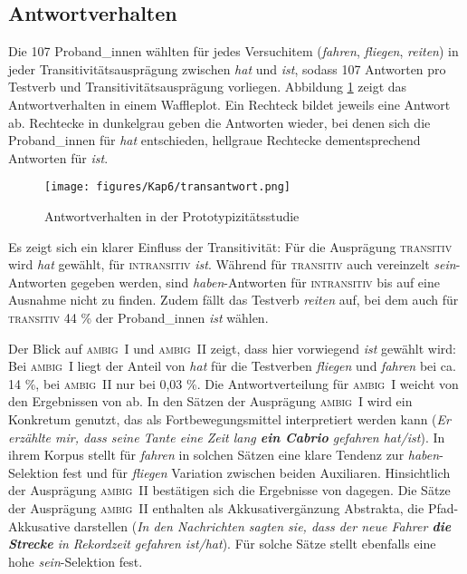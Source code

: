 \subsection{Antwortverhalten}
\label{antproto}
Die 107 Proband\_innen wählten für jedes Versuchitem (\textit{fahren}, \textit{fliegen}, \textit{reiten}) in jeder Transitivitätsausprägung zwischen \textit{hat} und \textit{ist}, sodass 107 Antworten pro Testverb und Transitivitätsausprägung vorliegen. Abbildung \ref{transantwortalle} zeigt das Antwortverhalten in einem Waffleplot. Ein Rechteck bildet jeweils eine Antwort ab. Rechtecke in dunkelgrau geben die Antworten wieder, bei denen sich die Proband\_innen für \textit{hat} entschieden, hellgraue Rechtecke dementsprechend Antworten für \textit{ist}. 

\begin{figure}
\texttt{[image: figures/Kap6/transantwort.png]} 
\caption{Antwortverhalten in der Prototypizitätsstudie}
\label{transantwortalle}
\end{figure}

Es zeigt sich ein klarer Einfluss der Transitivität: Für die Ausprägung \textsc{transitiv} wird \textit{hat} gewählt, für \textsc{intransitiv} \textit{ist}. Während für \textsc{transitiv} auch vereinzelt \textit{sein}-Antworten gegeben werden, sind \textit{haben}-Antworten für \textsc{intransitiv} bis auf eine Ausnahme nicht zu finden. Zudem fällt das Testverb \textit{reiten} auf, bei dem auch für \textsc{transitiv} 44 \% der Proband\_innen \textit{ist} wählen. 



Der Blick auf \textsc{ambig~I} und \textsc{ambig~II} zeigt, dass hier vorwiegend \textit{ist} gewählt wird: Bei \textsc{ambig~I} liegt der Anteil von \textit{hat} für die Testverben \textit{fliegen} und \textit{fahren} bei ca. 14 \%, bei \textsc{ambig~II} nur bei 0,03 \%. Die Antwortverteilung für \textsc{ambig~I} weicht von den Ergebnissen von \textcite[286--291]{Gillmann.2016} ab. In den Sätzen der Ausprägung \textsc{ambig~I} wird ein Konkretum genutzt, das als Fortbewegungsmittel interpretiert werden kann (\textit{Er erzählte mir, dass seine Tante eine Zeit lang \textbf{ein Cabrio} gefahren hat/ist}). In ihrem Korpus stellt \textcite[286--291]{Gillmann.2016} für \textit{fahren} in solchen Sätzen eine klare Tendenz zur \textit{haben}-Selektion fest und für \textit{fliegen} Variation zwischen beiden Auxiliaren. Hinsichtlich der Ausprägung \textsc{ambig~II} bestätigen sich die Ergebnisse von \textcite[299--301]{Gillmann.2016} dagegen. Die Sätze der Ausprägung \textsc{ambig~II} enthalten als Akkusativergänzung Abstrakta, die Pfad-Akkusative darstellen (\textit{In den Nachrichten sagten sie, dass der neue Fahrer \textbf{die Strecke} in Rekordzeit gefahren ist/hat}). Für solche Sätze stellt \textcite[299--301]{Gillmann.2016} ebenfalls eine hohe \textit{sein}-Selektion fest. 



